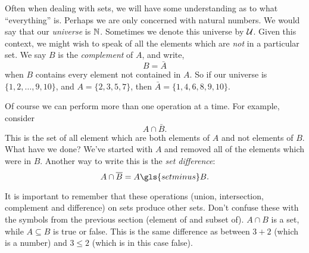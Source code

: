 \documentclass[12pt]{article}
\begin{document}
Often when dealing with sets, we will have some understanding as to what ``everything'' is.  Perhaps we are only concerned with natural numbers.  We would say that our \emph{universe} is $\mathbb N$.  Sometimes we denote this universe by $\mathcal U$.  Given this context, we might wish to speak of all the elements which are \emph{not} in a particular set.  We say $B$ is the \emph{complement} of $A$, and write,
\[ B = \bar A\]
when $B$ contains every element not contained in $A$.  So if our universe is $\{1, 2,\ldots, 9, 10\}$, and $A = \{2, 3, 5, 7\}$, then $\bar A = \{1, 4, 6, 8, 9,10\}$.

Of course we can perform more than one operation at a time.  For example, consider
\[A \cap \bar B.\]
This is the set of all element which are both elements of $A$ and not elements of $B$.  What have we done?  We've started with $A$ and removed all of the elements which were in $B$.  Another way to write this is the \emph{set difference}:
\[A \cap \bar B = A \gls{setminus} B.\]

It is important to remember that these operations (union, intersection, complement and difference) on sets produce other sets.  Don't confuse these with the symbols from the previous section (element of and subset of).  $A \cap B$ is a set, while $A \subseteq B$ is true or false.  This is the same difference as between $3 + 2$ (which is a number) and $3 \le 2$ (which is in this case false).
\end{document}
